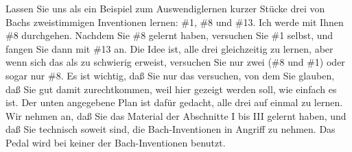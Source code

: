 Lassen Sie uns als ein Beispiel zum Auswendiglernen kurzer Stücke drei von Bachs zweistimmigen Inventionen lernen: \#1, \#8 und \#13.
Ich werde mit Ihnen \#8 durchgehen.
Nachdem Sie \#8 gelernt haben, versuchen Sie \#1 selbst, und fangen Sie dann mit \#13 an.
Die Idee ist, alle drei gleichzeitig zu lernen, aber wenn sich das als zu schwierig erweist, versuchen Sie nur zwei (\#8 und \#1) oder sogar nur \#8.
Es ist wichtig, daß Sie nur das versuchen, von dem Sie glauben, daß Sie gut damit zurechtkommen, weil hier gezeigt werden soll, wie einfach es ist.
Der unten angegebene Plan ist dafür gedacht, alle drei auf einmal zu lernen.
Wir nehmen an, daß Sie das Material der Abschnitte I bis III gelernt haben, und daß Sie technisch soweit sind, die Bach-Inventionen in Angriff zu nehmen.
Das Pedal wird bei keiner der Bach-Inventionen benutzt.



